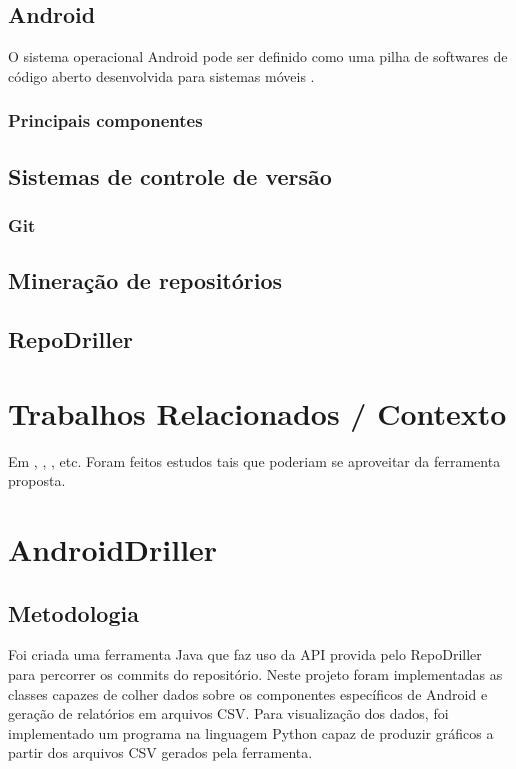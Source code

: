 \documentclass[a4paper,12pt]{article}
\begin{document}
\subsection{Android}%
O sistema operacional Android pode ser definido como uma pilha de softwares de código aberto desenvolvida para sistemas móveis \cite{androidSource}.
\subsubsection{Principais componentes}

\subsection{Sistemas de controle de versão}%
\subsubsection{Git}%
\subsection{Mineração de repositórios}%
\subsection{RepoDriller}%
\cite{repodriller}

\newpage
\section{Trabalhos Relacionados / Contexto}%
Em \cite{Calciati}, \cite{WhoAdded}, \cite{YLyu}, etc. Foram feitos estudos tais que poderiam se aproveitar da ferramenta proposta.


\newpage
\section{AndroidDriller}%

\subsection{Metodologia}

Foi criada uma ferramenta Java que faz uso da API provida pelo RepoDriller para
percorrer os commits do repositório. Neste projeto foram implementadas as
classes capazes de colher dados sobre os componentes específicos de Android e
geração de relatórios em arquivos CSV. Para visualização dos dados, foi
implementado um programa na linguagem Python capaz de produzir gráficos a
partir dos arquivos CSV gerados pela ferramenta.\\
\end{document}
